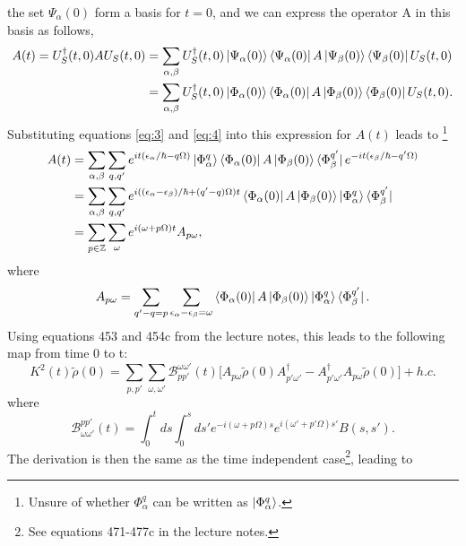 \documentclass[10pt]{article}
\numberwithin{equation}{section}
\begin{document}
the set $\Psi_{\alpha}(0)$ form a basis for $t=0$, and we can express the operator A in this basis as follows,
\begin{align} \label{eq:5}
A(t) =  U^{\dagger}_{S}(t,0)AU_{S}(t,0) &= \sum_{\alpha,\beta} U^{\dagger}_{S}(t,0)\ket{\Psi_{\alpha}(0)}\bra{\Psi_{\alpha}(0)}A\ket{\Psi_{\beta}(0)}\bra{\Psi_{\beta}(0)}U_{S}(t,0) \\
                                                       &=   \sum_{\alpha,\beta} U^{\dagger}_{S}(t,0)\ket{\Phi_{\alpha}(0)}\bra{\Phi_{\alpha}(0)}A\ket{\Phi_{\beta}(0)}\bra{\Phi_{\beta}(0)}U_{S}(t,0).
\end{align}
Substituting equations \ref{eq:3} and \ref{eq:4} into this expression for $A(t)$ leads to \footnote{Unsure of whether $\Phi_{\alpha}^{q}$ can be written as $\ket{\Phi_{\alpha}^{q}}$.}
\begin{align}
A(t) &= \sum_{\alpha,\beta}\sum_{q,q'}e^{it(\epsilon_{\alpha}/\hbar - q\Omega)}\ket{\Phi_{\alpha}^{q}}\bra{\Phi_{\alpha}(0)}A\ket{\Phi_{\beta}(0)}\bra{\Phi_{\beta}^{q'}}e^{-it(\epsilon_{\beta}/\hbar - q'\Omega)} \\
      &=  \sum_{\alpha,\beta}\sum_{q,q'}e^{i((\epsilon_{\alpha}-\epsilon_{\beta})/\hbar + (q'-q)\Omega)t}\bra{\Phi_{\alpha}(0)}A\ket{\Phi_{\beta}(0)}\ket{\Phi_{\alpha}^{q}}\bra{\Phi_{\beta}^{q'}}\\
      &=   \sum_{p \in\mathbb{Z}} \sum_{\omega} e^{i(\omega + p\Omega)t} A_{p\omega},
\end{align}
where 
\begin{equation}
A_{p\omega} =  \sum_{q'-q = p} \sum_{\epsilon_{\alpha}-\epsilon_{\beta} = \omega}  \bra{\Phi_{\alpha}(0)}A\ket{\Phi_{\beta}(0)}\ket{\Phi_{\alpha}^{q}}\bra{\Phi_{\beta}^{q'}}.
\end{equation}
Using equations 453 and 454c from the lecture notes, this leads to the following map from time 0 to t:
\begin{equation}
K^{2}(t)\tilde{\rho}(0) =  \sum_{p,p'} \sum_{\omega,\omega '}\mathcal{B}^{\omega\omega '}_{pp'}(t)\bigg[A_{p\omega}\tilde{\rho}(0)A_{p'\omega '}^{\dagger} - A_{p'\omega '}^{\dagger}A_{p\omega} \tilde{\rho}(0)\bigg] + h.c.
\end{equation}
where 
\begin{equation} \label{eq:9}
\mathcal{B}_{\omega\omega '}^{pp'}(t) = \int_0^t ds \int_0^s ds'  e^{-i(\omega + p\Omega)s}e^{i(\omega ' + p'\Omega)s'}B(s,s').
\end{equation}
The derivation is then the same as the time independent case\footnote{See equations 471-477c in the lecture notes.}, leading to 
\end{document}
